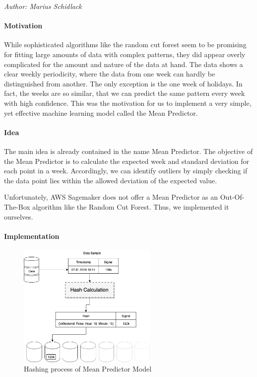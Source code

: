 \textit{Author: Marius Schidlack} \\
\label{mean-predictor}
\paragraph{Motivation}
While sophisticated algorithms like the random cut forest seem to be promising for fitting large amounts of data with complex patterns, they did appear overly complicated for the amount and nature of the data at hand. The data shows a clear weekly periodicity, where the data from one week can hardly be distinguished from another. The only exception is the one week of holidays. In fact, the weeks are so similar, that we can predict the same pattern every week with high confidence. This was the motivation for us to implement a very simple, yet effective machine learning model called the Mean Predictor.

\paragraph{Idea}
The main idea is already contained in the name Mean Predictor. The objective of the Mean Predictor is to calculate the expected week and standard deviation for each point in a week. Accordingly, we can identify outliers by simply checking if the data point lies within the allowed deviation of the expected value. 

Unfortunately, AWS Sagemaker does not offer a Mean Predictor as an Out-Of-The-Box algorithm like the Random Cut Forest. Thus, we implemented it ourselves.

\paragraph{Implementation}

\begin{figure}
    \centering
    \includegraphics[width=0.6\textwidth]{images/mean_predictor_hashing.png}
    \caption{Hashing process of Mean Predictor Model}
    \label{fig:mean_predictor_hashing}
\end{figure}

